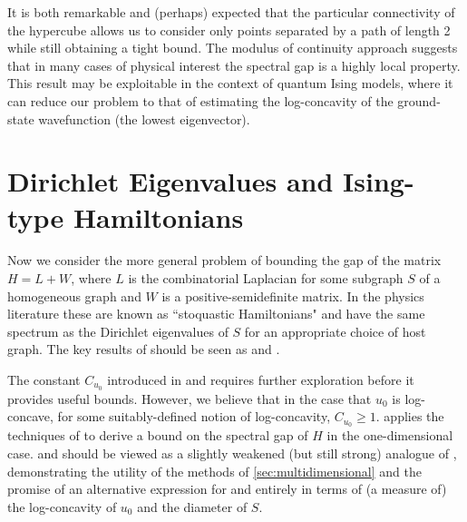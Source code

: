 It is both remarkable and (perhaps) expected that the particular connectivity of the hypercube allows us to consider only points separated by a path of length 2 while still obtaining a tight bound. The modulus of continuity approach suggests that in many cases of physical interest the spectral gap is a highly local property. This result may be exploitable in the context of quantum Ising models, where it can reduce our problem to that of estimating the log-concavity of the ground-state wavefunction (the lowest eigenvector). 

\section{Dirichlet Eigenvalues and Ising-type Hamiltonians}\label{sec:Dirichlet}
Now we consider the more general problem of bounding the gap of the matrix $H=L + W$, where $L$ is the combinatorial Laplacian for some subgraph $S$ of a homogeneous graph and $W$ is a positive-semidefinite matrix. In the physics literature these are known as ``stoquastic Hamiltonians" and have the same spectrum as the Dirichlet eigenvalues of $S$ for an appropriate choice of host graph. The key results of  should be seen as  and . 

The constant $C_{u_0}$ introduced in  and  requires further exploration before it provides useful bounds. However, we believe that in the case that $u_0$ is log-concave, for some suitably-defined notion of log-concavity, $C_{u_0}\geq 1$.  applies the techniques of  to derive a bound on the spectral gap of $H$ in the one-dimensional case.  and  should be viewed as a slightly weakened (but still strong) analogue of , demonstrating the utility of the methods of \cref{sec:multidimensional} and the promise of an alternative expression for  and  entirely in terms of (a measure of) the log-concavity of $u_0$ and the diameter of $S$.

